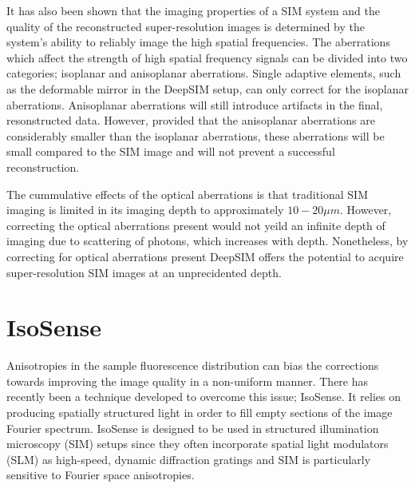 It has also been shown that the imaging properties of a SIM
system and the quality of the reconstructed super-resolution
images is determined by the system's ability to reliably
image the high spatial frequencies.\cite{debarre2008adaptive,thomas2015enhanced}
The aberrations which affect the strength of high spatial 
frequency signals can be divided into two categories; 
isoplanar and anisoplanar aberrations. Single adaptive 
elements, such as the deformable mirror in the DeepSIM 
setup, can only correct for the isoplanar aberrations.
Anisoplanar aberrations will still introduce artifacts 
in the final, resonstructed data. However, provided that
the anisoplanar aberrations are considerably smaller than
the isoplanar aberrations, these aberrations will be small
compared to the SIM image and will not prevent a successful
reconstruction.\cite{thomas2015enhanced}

The cummulative effects of the optical aberrations is that
traditional SIM imaging is limited in its imaging depth to
approximately $10-20\mu m$.\cite{schermelleh2019super,wu2018faster} However, 
correcting the optical aberrations present would not yeild
an infinite depth of imaging due to scattering of photons,
which increases with depth. Nonetheless, by correcting for
optical aberrations present DeepSIM offers the potential to 
acquire super-resolution SIM images at an unprecidented depth.

\section{IsoSense}
\label{sec:isosense}

Anisotropies in the sample fluorescence distribution can bias 
the corrections towards improving the image quality in a 
non-uniform manner. There has recently been a technique developed 
to overcome  this issue; IsoSense\cite{vzurauskas2019isosense}. 
It relies  on producing spatially structured light in order to fill 
empty sections of the image Fourier spectrum. IsoSense is designed 
to be used in structured illumination microscopy (SIM) setups since 
they often incorporate spatial light modulators (SLM) as high-speed, 
dynamic diffraction  gratings and SIM is particularly sensitive to 
Fourier space anisotropies.

